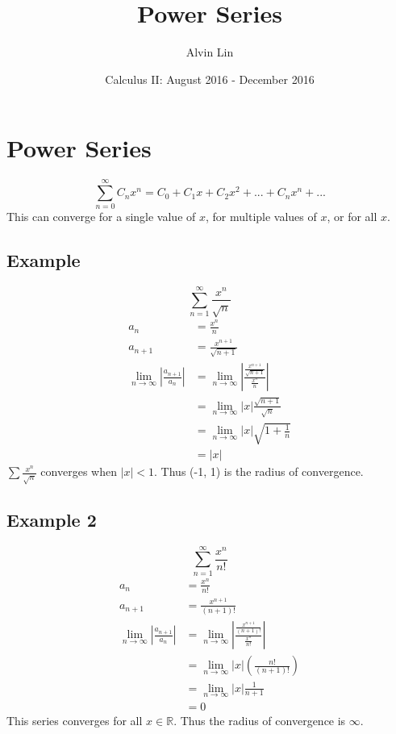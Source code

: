 \documentclass[letterpaper, 12pt]{article}
\title{Power Series}
\author{Alvin Lin}
\date{Calculus II: August 2016 - December 2016}
\begin{document}
\maketitle

\section*{Power Series}

\[ \sum_{n=0}^{\infty}C_{n}x^{n} =
   C_{0}+C_{1}x+C_{2}x^{2}+...+C_{n}x^{n}+... \]
This can converge for a single value of \( x \), for multiple values of \( x \),
or for all \( x \).

\subsection*{Example}
\[ \sum_{n=1}^{\infty}\frac{x^{n}}{\sqrt{n}} \]
\begin{align*}
  a_{n} &= \frac{x^{n}}{n} \\
  a_{n+1} &= \frac{x^{n+1}}{\sqrt{n+1}} \\
  \lim_{n\to\infty}|\frac{a_{n+1}}{a_{n}}| &=
    \lim_{n\to\infty}|\frac{\frac{x^{n+1}}{\sqrt{n+1}}}{\frac{x^{n}}{n}}| \\
  &= \lim_{n\to\infty}|x|\frac{\sqrt{n+1}}{\sqrt{n}} \\
  &= \lim_{n\to\infty}|x|\sqrt{1+\frac{1}{n}} \\
  &= |x|
\end{align*}
\( \sum\frac{x^{n}}{\sqrt{n}} \) converges when \( |x| < 1 \). Thus (-1, 1)
is the radius of convergence.

\subsection*{Example 2}
\[ \sum_{n=1}^{\infty}\frac{x^{n}}{n!} \]
\begin{align*}
  a_{n} &= \frac{x^{n}}{n!} \\
  a_{n+1} &= \frac{x^{n+1}}{(n+1)!} \\
  \lim_{n\to\infty}|\frac{a_{n+1}}{a_{n}}| &=
    \lim_{n\to\infty}|\frac{\frac{x^{n+1}}{(n+1)!}}{\frac{x^{n}}{n!}}| \\
  &= \lim_{n\to\infty}|x|(\frac{n!}{(n+1)!}) \\
  &= \lim_{n\to\infty}|x|\frac{1}{n+1} \\
  &= 0
\end{align*}
This series converges for all \( x \in \mathbb{R} \). Thus the radius of
convergence is \( \infty \).
\end{document}
